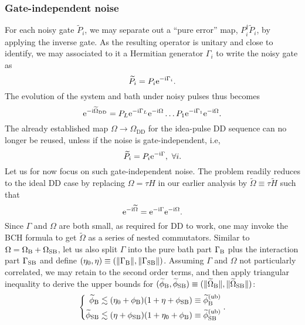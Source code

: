 \documentclass[pra,reprint,superscriptaddress]{revtex4-2}
\newcommand{\wtP}{\widetilde{P}}
\newcommand{\wtH}{\widetilde{H}}
\newcommand{\wtO}{\widetilde{\Omega}}
\newcommand{\rDD}{\mathrm{DD}}
\begin{document}
\subsubsection{Gate-independent noise}
For each noisy gate $\wtP_i$, we may separate out a ``pure error'' map, $P_i^{\dagger} \wtP_i$, by applying the inverse gate.  As the resulting operator is unitary and close to identify,  we may associated to it a Hermitian generator $\Gamma_i$ to write the noisy gate as
\begin{equation}
 \wtP_i = P_i \upe^{-\upi \Gamma_i}.
\end{equation}
The evolution of the system and bath under noisy pulses thus becomes
\begin{equation}\label{eq:UDD-gatedep}
 \upe^{-\upi\wtO_\rDD} = P_L\upe^{-\upi \Gamma_L} \upe^{-\upi \Omega} \ldots  P_1\upe^{-\upi \Gamma_1}\upe^{-\upi \Omega }.
\end{equation}
The already established map $\Omega\to \Omega_{\rDD}$ for the idea-pulse DD sequence can no longer be reused, unless if the noise is gate-independent, i.e,
\begin{equation}\label{eq:gateindep1}
 \wtP_i = P_i \upe^{-\upi \Gamma},\ \forall i.
\end{equation}
Let us for now focus on such gate-independent noise. The problem readily reduces to the ideal DD case by replacing $\Omega=\tau H$ in our earlier analysis by $\wtO \equiv \tau \wtH$ such that
\begin{equation}
\upe^{-\upi \wtO}=\upe^{-\upi \Gamma}\upe^{-\upi \Omega}.
\end{equation}
Since $\Gamma$ and $\Omega$ are both small, as required for DD to work,
one may invoke the BCH formula to get $\wtO$ as a series of nested commutators. 
Similar to $\Omega=\Omega_{\mathrm{B}} + \Omega_{\mathrm{SB}}$, let us also split $\Gamma$ into the pure bath part $\Gamma_{\mathrm{B}}$ plus the interaction part $\Gamma_{\mathrm{SB}}$ and define 
$(\eta_0,\eta) \equiv (\Vert\Gamma_{\mathrm{B}}\Vert, \Vert\Gamma_{\mathrm{SB}}\Vert)$.
Assuming $\Gamma$ and $\Omega$ not particularly correlated, we may retain to the second order terms, and then apply triangular inequality to derive the upper bounds for $(\widetilde\phi_\rB,\widetilde{\phi}_\rSB) \equiv( \norm{\wtO_\rB}, \norm{\wtO_\rSB})$:
\begin{equation}\label{eq:comb-bound}
\left\{
\begin{aligned}
 \widetilde\phi_{\mathrm{B}} &\lesssim (\eta_0 + \phi_{\mathrm{B}})(1+\eta + \phi_{\mathrm{SB}}) \equiv \widetilde\phi_{\mathrm{B}}^{(\mathrm{ub})}\\
 \widetilde\phi_{\mathrm{SB}} &\lesssim (\eta + \phi_{\mathrm{SB}}) (1+\eta_0 + \phi_{\mathrm{B}})\equiv \widetilde\phi_{\mathrm{SB}}^{(\mathrm{ub})}
\end{aligned}
\right..
\end{equation}
\end{document}

